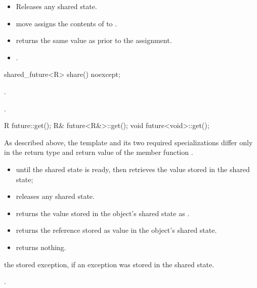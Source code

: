 \begin{itemdescr}
\pnum
\effects
\begin{itemize}
\item
Releases any shared state.
\item
move assigns the contents of  to .
\end{itemize}

\pnum
\postconditions
\begin{itemize}
\item
{} returns the same value as  prior to the
assignment.

\item
{}.
\end{itemize}
\end{itemdescr}

%
\begin{itemdecl}
shared_future<R> share() noexcept;
\end{itemdecl}

\begin{itemdescr}
\pnum
\returns {}.

\pnum
\postconditions {}.
\end{itemdescr}

%
\begin{itemdecl}
R future::get();
R& future<R&>::get();
void future<void>::get();
\end{itemdecl}

\begin{itemdescr}
\pnum
\begin{note}
As described above, the template and its two required specializations differ only in
the return type and return value of the member function .
\end{note}

\pnum
\effects
\begin{itemize}
\item {} until the shared state is ready, then retrieves the
value stored in the shared state;
\item releases any shared state.
\end{itemize}

\pnum
\returns
\begin{itemize}
\item
{} returns the value  stored in the object's shared state as
.

\item
{} returns the reference stored as value in the object's shared state.

\item
{} returns nothing.
\end{itemize}

\pnum
\throws the stored exception, if an exception was stored in the shared state.

\pnum
\postconditions {}.
\end{itemdescr}

